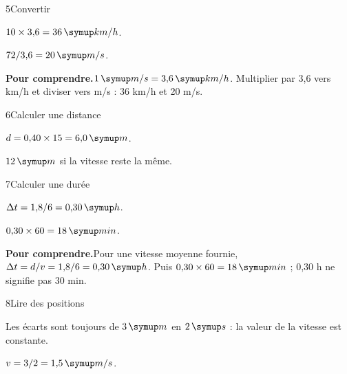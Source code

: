 \par\noindent\begin{minipage}{\linewidth}
\begin{corrige}{5}{Convertir}
\begin{questions}
\item $10\times3{,}6=36\unite{km/h}$.
\item $72/3{,}6=20\unite{m/s}$.
\end{questions}
\par\smallskip\noindent\textbf{Pour comprendre.}\enspace $1\unite{m/s}=3{,}6\unite{km/h}$. Multiplier par 3,6 vers km/h et diviser vers m/s : 36 km/h et 20 m/s.\par
\end{corrige}
\end{minipage}
\par\noindent\begin{minipage}{\linewidth}
\begin{corrige}{6}{Calculer une distance}
\begin{questions}
\item $d=0{,}40\times15=6{,}0\unite m$.
\item $12\unite m$ si la vitesse reste la même.
\end{questions}
\end{corrige}
\end{minipage}
\par\noindent\begin{minipage}{\linewidth}
\begin{corrige}{7}{Calculer une durée}
\begin{questions}
\item $\Delta t=1{,}8/6=0{,}30\unite h$.
\item $0{,}30\times60=18\unite{min}$.
\end{questions}
\par\smallskip\noindent\textbf{Pour comprendre.}\enspace Pour une vitesse moyenne fournie, $\Delta t=d/v=1{,}8/6=0{,}30\unite h$. Puis $0{,}30\times60=18\unite{min}$ ; 0,30 h ne signifie pas 30 min.\par
\end{corrige}
\end{minipage}
\par\noindent\begin{minipage}{\linewidth}
\begin{corrige}{8}{Lire des positions}
\begin{questions}
\item Les écarts sont toujours de $3\unite m$ en $2\unite s$ : la valeur de la vitesse est constante.
\item $v=3/2=1{,}5\unite{m/s}$.
\end{questions}
\end{corrige}
\end{minipage}
